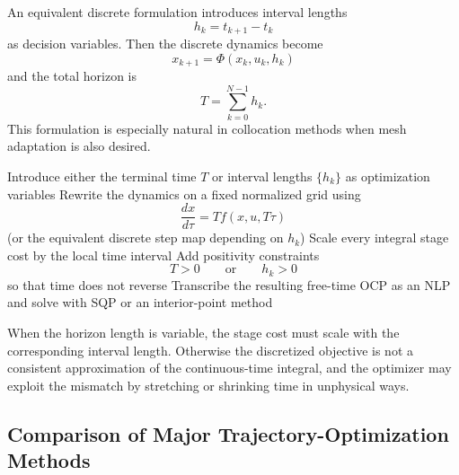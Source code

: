 \begin{remark}
	An equivalent discrete formulation introduces interval lengths
	\[
		h_k=t_{k+1}-t_k
	\]
	as decision variables. Then the discrete dynamics become
	\[
		x_{k+1}=\Phi(x_k,u_k,h_k)
	\]
	and the total horizon is
	\[
		T=\sum_{k=0}^{N-1} h_k.
	\]
	This formulation is especially natural in collocation methods when mesh adaptation is also desired.
\end{remark}

\begin{algorithm}[H]
	\DontPrintSemicolon
	\caption{Direct Transcription for a Free-Time Problem}
\label{alg:l5-direct-transcription-for-a-free-time-problem}
	Introduce either the terminal time $T$ or interval lengths $\{h_k\}$ as optimization variables\;
	Rewrite the dynamics on a fixed normalized grid using
	\[
		\frac{dx}{d\tau}=T f(x,u,T\tau)
	\]
	(or the equivalent discrete step map depending on $h_k$)\;
	Scale every integral stage cost by the local time interval\;
	Add positivity constraints
	\[
		T>0
		\qquad \text{or} \qquad
		h_k>0
	\]
	so that time does not reverse\;
	Transcribe the resulting free-time OCP as an NLP and solve with SQP or an interior-point method\;
\end{algorithm}

\begin{remark}
	When the horizon length is variable, the stage cost must scale with the corresponding interval length. Otherwise the discretized objective is not a consistent approximation of the continuous-time integral, and the optimizer may exploit the mismatch by stretching or shrinking time in unphysical ways.
\end{remark}

\subsection{Comparison of Major Trajectory-Optimization Methods}
\label{sec:l5-comparison-of-major-trajectory-optimization-methods}

